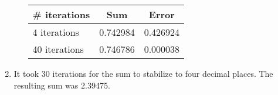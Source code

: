 \documentclass[11pt]{article}
\begin{document}
\begin{enumerate}
\begin{enumerate}[label={\roman*)}]
\begin{center}
\begin{tabular}{l c c}
                            \toprule
                            \multicolumn{1}{c}{\# iterations} & Sum & Error \\
                            \midrule
                            4 iterations & 0.742984 & 0.426924 \\
                            40 iterations & 0.746786 & 0.000038 \\
                            \bottomrule
                        \end{tabular}
                    \end{center}
            \end{enumerate}
        \item
            It took 30 iterations for the sum to stabilize to four decimal places. The resulting sum was 2.39475.
    \end{enumerate}
\end{document}
